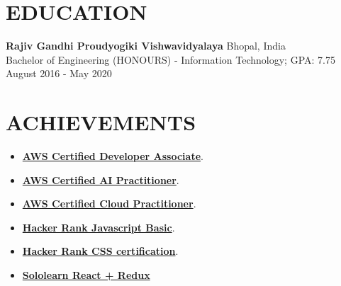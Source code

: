 \sectionline
\section*{EDUCATION}
\textbf{Rajiv Gandhi Proudyogiki Vishwavidyalaya} \hfill Bhopal, India \\[2pt]
Bachelor of Engineering (HONOURS) - Information Technology; GPA: 7.75 
\hfill August 2016 - May 2020

\sectionline
\section*{ACHIEVEMENTS}
\begin{itemize}
\item \href{https://www.credly.com/earner/earned/share/b3cbb0c0-3e79-44e8-9014-0f037b0dc12c} {\bf AWS Certified Developer Associate}.
\item \href{https://www.credly.com/badges/ed0f0afe-4927-4488-86b0-3956fb83e37c/linked_in_profile}{\bf AWS Certified AI Practitioner}.
\item \href{https://www.credly.com/badges/50f28d0d-2647-4f37-b78e-6bf5ce002d4e/linked_in_profile}{\bf AWS Certified Cloud Practitioner}.
\item \href{https://www.hackerrank.com/certificates/e8c2450c7b38/}{\bf Hacker Rank Javascript Basic}.
\item \href{https://www.hackerrank.com/certificates/3348c7124f7d} {\bf Hacker Rank CSS certification}.
\item \href{https://www.sololearn.com/en/certificates/CT-KRZNT5XO} {\bf Sololearn React + Redux}
\end{itemize}

\sectionline

